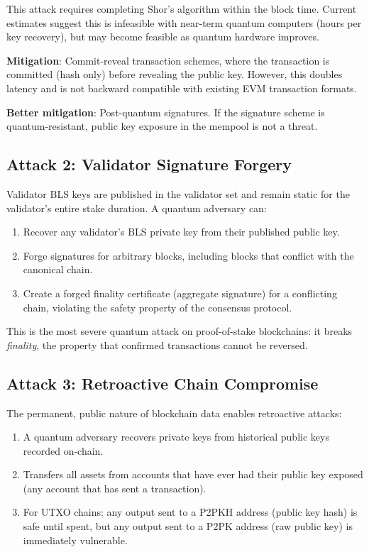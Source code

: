 \documentclass[11pt,a4paper]{article}
\begin{document}
This attack requires completing Shor's algorithm within the block time. Current
estimates suggest this is infeasible with near-term quantum computers (hours per key
recovery), but may become feasible as quantum hardware improves.

\textbf{Mitigation}: Commit-reveal transaction schemes, where the transaction is
committed (hash only) before revealing the public key. However, this doubles latency
and is not backward compatible with existing EVM transaction formats.

\textbf{Better mitigation}: Post-quantum signatures. If the signature scheme is
quantum-resistant, public key exposure in the mempool is not a threat.

\subsection{Attack 2: Validator Signature Forgery}

Validator BLS keys are published in the validator set and remain static for the
validator's entire stake duration. A quantum adversary can:

\begin{enumerate}[leftmargin=2em]
  \item Recover any validator's BLS private key from their published public key.
  \item Forge signatures for arbitrary blocks, including blocks that conflict with
        the canonical chain.
  \item Create a forged finality certificate (aggregate signature) for a conflicting
        chain, violating the safety property of the consensus protocol.
\end{enumerate}

This is the most severe quantum attack on proof-of-stake blockchains: it breaks
\emph{finality}, the property that confirmed transactions cannot be reversed.

\subsection{Attack 3: Retroactive Chain Compromise}

The permanent, public nature of blockchain data enables retroactive attacks:

\begin{enumerate}[leftmargin=2em]
  \item A quantum adversary recovers private keys from historical public keys
        recorded on-chain.
  \item Transfers all assets from accounts that have ever had their public key
        exposed (any account that has sent a transaction).
  \item For UTXO chains: any output sent to a P2PKH address (public key hash) is
        safe until spent, but any output sent to a P2PK address (raw public key) is
        immediately vulnerable.
\end{enumerate}
\end{document}
